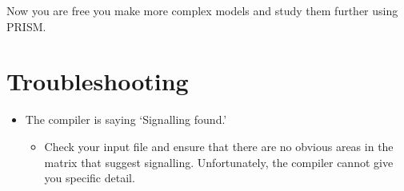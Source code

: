 \documentclass[report.tex]{subfiles}
\begin{document}
Now you are free you make more complex models and study them further using
PRISM.

\section{Troubleshooting} %
\label{sec:troubleshooting}
\begin{itemize}
    \item The compiler is saying `Signalling found.'
    \begin{itemize}
        \item Check your input file and ensure that there are no obvious areas
        in the matrix that suggest signalling. Unfortunately, the compiler
        cannot give you specific detail.
    \end{itemize}
    
\end{itemize}

\newpage
\end{document}
